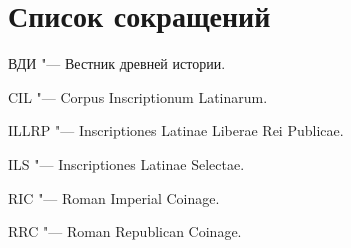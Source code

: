 
\pagebreak
\printbibliography[notkeyword=source,heading=mysubbibintoc]



\pagebreak
\section*{Список сокращений}
{}

ВДИ "--- Вестник древней истории.

CIL "--- Corpus Inscriptionum Latinarum.

ILLRP "--- Inscriptiones Latinae Liberae Rei Publicae.

ILS "--- Inscriptiones Latinae Selectae.

RIC "--- Roman Imperial Coinage.

RRC "--- Roman Republican Coinage.

